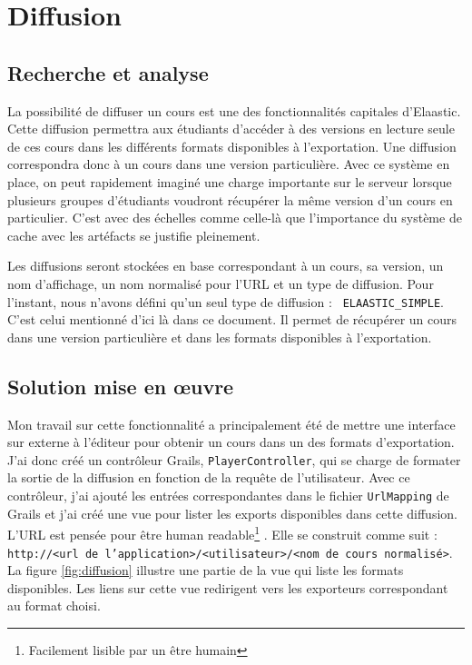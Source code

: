 \section{Diffusion}
\subsection{Recherche et analyse}
La possibilité de diffuser un cours est une des fonctionnalités capitales
d'Elaastic. Cette diffusion permettra aux étudiants d'accéder à des versions en
\og lecture seule \fg{} de ces cours dans les différents formats disponibles à
l'exportation. Une diffusion correspondra donc à un cours dans une version
particulière. Avec ce système en place, on peut rapidement imaginé une charge
importante sur le serveur lorsque plusieurs groupes d'étudiants voudront
récupérer la même version d'un cours en particulier. C'est avec des échelles
comme celle-là que l'importance du système de cache avec les artéfacts se
justifie pleinement.

Les diffusions seront stockées en base correspondant à un cours, sa version, un
nom d'affichage, un nom normalisé pour l'URL et un type de diffusion. Pour
l'instant, nous n'avons défini qu'un seul type de diffusion : {\tt
ELAASTIC\_SIMPLE}. C'est celui mentionné d'ici là dans ce document. Il permet de
récupérer un cours dans une version particulière et dans les formats disponibles
à l'exportation.

\subsection{Solution mise en \oe uvre}
Mon travail sur cette fonctionnalité a principalement été de mettre une interface
sur \og externe \fg{} à l'éditeur pour obtenir un cours dans un des formats
d'exportation. J'ai donc créé un contrôleur Grails, {\tt PlayerController}, qui
se charge de formater la sortie de la diffusion en fonction de la requête de
l'utilisateur. Avec ce contrôleur, j'ai ajouté les entrées correspondantes dans
le fichier {\tt UrlMapping} de Grails et j'ai créé une vue pour lister les
exports disponibles dans cette diffusion. L'URL est pensée pour être \og human
readable\footnote{Facilement lisible par un être humain} \fg{}. Elle se
construit comme suit : {\tt http://<url de l'application>/<utilisateur>/<nom de cours
normalisé>}. La figure \ref{fig:diffusion} illustre une partie de la vue qui
liste les formats disponibles. Les liens sur cette vue redirigent vers les
exporteurs correspondant au format choisi.

